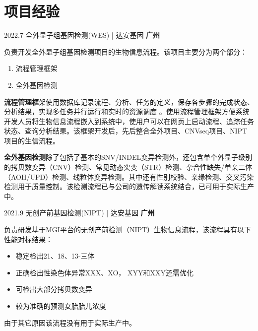 \documentclass[a4paper]{friggeri-cv_reccius-experiment}
\begin{document}
\section{项目经验}
\begin{entrylist}

    \entry
    {2022.7\enspace}
    {全外显子组基因检测(WES) | }{\small{达安基因}}
    {\normalsize\textbf{\color{ipsgreen}\faMapMarker\space 广州}}
    {
    负责开发全外显子组基因检测项目的生物信息流程。该项目主要分为两个部分：

    \begin{enumerate}
        \item 流程管理框架
        \item 全外基因检测
    \end{enumerate}

    \hspace{0.4cm}\textbf{流程管理框}架使用数据库记录流程、分析、任务的定义，保存各步骤的完成状态、分析结果，实现多任务并行运行和实时的资源调度
    。使用流程管理框架方便系统开发人员将生物信息流程嵌入到系统中，使用户可以在网页上启动流程、追踪任务状态、查询分析结果。该框架开发后，先后整合全外项目、CNVseq项目、NIPT项目的生信流程。
    
    \hspace{0.4cm}\textbf{全外基因检测}除了包括了基本的SNV/INDEL变异检测外，还包含单个外显子级别的拷贝数变异（CNV）检测、常见动态突变（STR）检测、杂合性缺失/单亲二体（AOH/UPD）检测、线粒体变异检测。其中还有性别校验、亲缘检测、交叉污染检测用于质量控制。该检测流程已与公司的遗传解读系统结合，已可用于实际生产中。\\
    }

    \entry
    {2021.9\enspace}
    {无创产前基因检测(NIPT) | }{\small{达安基因}}
    {\normalsize\textbf{\color{ipsgreen}\faMapMarker\space 广州}}
    {
    负责研发基于MGI平台的无创产前检测（NIPT）生物信息流程，该流程具有以下性能对标结果：

    \begin{itemize}
        \item 稳定检出21、18、13-三体
        \item 正确检出性染色体异常XXX、XO， XYY和XXY还需优化
        \item 可检出大部分拷贝数变异
        \item 较为准确的预测女胎胎儿浓度
    \end{itemize}

    由于其它原因该流程没有用于实际生产中。\\
    }
 

\end{entrylist}
\end{document}
